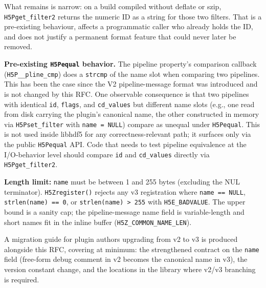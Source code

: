 \documentclass[../RFC-HDFG-2026-001.tex]{subfiles}
\begin{document}
\begin{itemize}
  What remains is narrow: on a build compiled without deflate or szip,
  \texttt{H5Pget\_filter2} returns the numeric ID as a string for those
  two filters.  That is a pre-existing behaviour, affects a programmatic
  caller who already holds the ID, and does not justify a permanent
  format feature that could never later be removed.

  \textbf{Pre-existing \texttt{H5Pequal} behavior.}  The pipeline
  property's comparison callback (\texttt{H5P\_\_pline\_cmp}) does a
  \texttt{strcmp} of the name slot when comparing two pipelines.  This
  has been the case since the V2 pipeline-message format was
  introduced and is not changed by this RFC.  One observable
  consequence is that two pipelines with identical \texttt{id},
  \texttt{flags}, and \texttt{cd\_values} but different name slots
  (e.g., one read from disk carrying the plugin's canonical name, the
  other constructed in memory via \texttt{H5Pset\_filter} with
  \texttt{name = NULL}) compare as unequal under \texttt{H5Pequal}.
  This is not used inside libhdf5 for any correctness-relevant path;
  it surfaces only via the public \texttt{H5Pequal} API.  Code that
  needs to test pipeline equivalence at the I/O-behavior level should
  compare \texttt{id} and \texttt{cd\_values} directly via
  \texttt{H5Pget\_filter2}.

  \textbf{Length limit:} \texttt{name} must be between 1 and 255 bytes
  (excluding the NUL terminator).  \texttt{H5Zregister()} rejects any v3
  registration where \texttt{name == NULL}, \texttt{strlen(name) == 0},
  or \texttt{strlen(name) > 255} with \texttt{H5E\_BADVALUE}.  The upper
  bound is a sanity cap; the pipeline-message name field is
  variable-length and short names fit in the inline buffer
  (\texttt{H5Z\_COMMON\_NAME\_LEN}).

  A migration guide for plugin authors upgrading from v2 to v3 is
  produced alongside this RFC, covering at minimum: the strengthened
  contract on the \texttt{name} field (free-form debug comment in v2
  becomes the canonical name in v3), the version constant change, and
  the locations in the library where v2/v3 branching is required.


\end{itemize}
\end{document}
